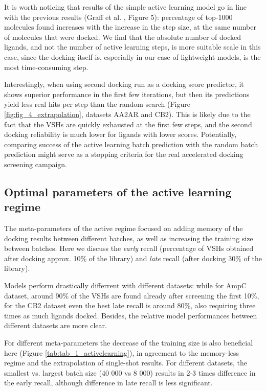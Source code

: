 It is worth noticing that results of the simple active learning model go in line with the previous results (Graff et al. \cite{Graff2021AcceleratingLearning}, Figure 5): percentage of top-1000 molecules found increases with the increase in the step size, at the same number of molecules that were docked. We find that the absolute number of docked ligands, and not the number of active learning steps, is more suitable scale in this case, since the docking itself is, especially in our case of lightweight models, is the most time-consuming step.

Interestingly, when using second docking run as a docking score predictor, it shows superior performance in the first few iterations, but then its predictions yield less real hits per step than the random search (Figure \ref{fig:fig_4_extrapolation}, datasets AA2AR and CB2). This is likely due to the fact that the VSHs are quickly exhausted at the first few steps, and the second docking reliability is much lower for ligands with lower scores. Potentially, comparing success of the active learning batch prediction with the random batch prediction might serve as a stopping criteria for the real accelerated docking screening campaign.

\subsection{Optimal parameters of the active learning regime}
The meta-parameters of the active regime focused on adding memory of the docking results between different batches, as well as increasing the training size between batches. Here we discuss the \textit{early} recall (percentage of VSHs obtained after docking approx. 10\% of the library) and \textit{late} recall (after docking 30\% of the library).

Models perform drastically differrent with different datasets: while for AmpC dataset, around 90\% of the VSHs are found already after screening the first 10\%, for the CB2 dataset even the best late recall is around 80\%, also requiring three times as much ligands docked. Besides, the relative model performances between different datasets are more clear.

For different meta-parameters the decrease of the training size is also beneficial here (Figure \ref{tab:tab_1_activelearning}), in agreement to the memory-less regime and the extrapolation of single-shot results. For different datasets, the smallest vs. largest batch size (40 000 vs 8 000) results in 2-3 times difference in the early recall, although difference in late recall is less significant.

